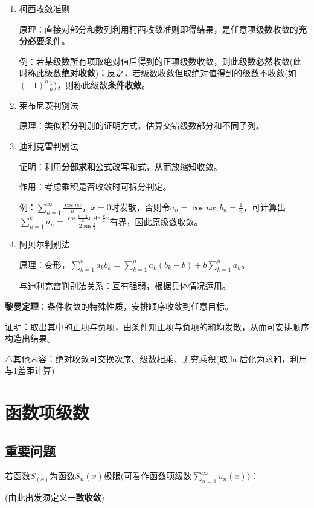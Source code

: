 \documentclass[a4paper,UTF8]{ctexart}
\begin{document}
\begin{enumerate}
\item 柯西收敛准则

原理：直接对部分和数列利用柯西收敛准则即得结果，是任意项级数收敛的\textbf{充分必要}条件。

例：若某级数所有项取绝对值后得到的正项级数收敛，则此级数必然收敛(此时称此级数\textbf{绝对收敛})；反之，若级数收敛但取绝对值得到的级数不收敛(如$(-1)^n\frac{1}{n}$)，则称此级数\textbf{条件收敛}。

\item 莱布尼茨判别法

原理：类似积分判别的证明方式，估算交错级数部分和不同子列。

\item 迪利克雷判别法

证明：利用\textbf{分部求和}公式改写和式，从而放缩知收敛。

作用：考虑乘积是否收敛时可拆分判定。

例：$\sum_{n=1}^\infty\frac{\cos nx}{n}$，$x=0$时发散，否则令$a_n=\cos nx,b_n=\frac{1}{n}$，可计算出$\sum_{n=1}^ka_n=\frac{\cos\frac{k+1}{2}x\sin\frac{k}{2}x}{2\sin\frac{x}{2}}$有界，因此原级数收敛。

\item 阿贝尔判别法

原理：变形，$\sum_{k=1}^na_kb_k=\sum_{k=1}^na_k(b_k-b)+b\sum_{k=1}^na_k$。

与迪利克雷判别法关系：互有强弱，根据具体情况运用。
\end{enumerate}

\textbf{黎曼定理}：条件收敛的特殊性质，安排顺序收敛到任意目标。

证明：取出其中的正项与负项，由条件知正项与负项的和均发散，从而可安排顺序构造出结果。

$\triangle$其他内容：绝对收敛可交换次序、级数相乘、无穷乘积(取$\ln$后化为求和，利用与1差距计算)

\section{函数项级数}
\subsection{重要问题}
若函数$S_(x)$为函数$S_n(x)$极限(可看作函数项级数$\sum_{n=1}^\infty u_n(x)$)：

(由此出发须定义\textbf{一致收敛})
\end{document}
